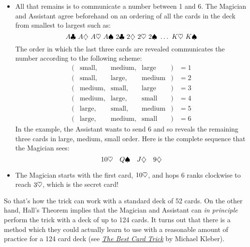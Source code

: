 \begin{itemize}
\begin{itemize}
\end{itemize}

\item All that remains is to communicate a number between 1 and 6.
The Magician and Assistant agree beforehand on an ordering of all the
cards in the deck from smallest to largest such as:
%
\[
A \clubsuit\  A \diamondsuit\  A \heartsuit\ A \spadesuit\
2 \clubsuit\  2 \diamondsuit\  2 \heartsuit\ 2 \spadesuit\
\dots\ K \heartsuit\ K \spadesuit
\]
%
The order in which the last three cards are revealed communicates the
number according to the following scheme:
%
\[
\begin{array}{rcccll}
(&\text{small},&\text{medium},&\text{large}&) & = 1 \\
(&\text{small},&\text{large},&\text{medium}&) & = 2 \\
(&\text{medium},&\text{small},&\text{large}&) & = 3 \\
(&\text{medium},&\text{large},&\text{small}&) & = 4 \\
(&\text{large},&\text{small},&\text{medium}&) & = 5 \\
(&\text{large},&\text{medium},&\text{small}&) & = 6
\end{array}
\]
%
In the example, the Assistant wants to send 6 and so reveals the
remaining three cards in large, medium, small order.  Here is the
complete sequence that the Magician sees:
%
\[
10 \heartsuit \quad Q \spadesuit \quad J \diamondsuit \quad 9 \diamondsuit
\]

\item The Magician starts with the first card, $10 \heartsuit$, and hops 6
ranks clockwise to reach $3 \heartsuit$, which is the secret card!

\end{itemize}

So that's how the trick can work with a standard deck of 52 cards.  On the
other hand, Hall's Theorem implies that the Magician and Assistant can
\emph{in principle} perform the trick with a deck of up to 124 cards.  It
turns out that there is a method which they could actually learn to use
with a reasonable amount of practice for a 124 card deck (see
\href{http://courses.csail.mit.edu/6.042/spring10/cardTrick.pdf}{\emph{The Best
    Card Trick}} by Michael Kleber).
\fi


\iffalse
http://people.brandeis.edu/~kleber/Papers/card.pdf

Also, \emph{Using a Card Trick to Teach Discrete Mathematics}, Simonson,
Shai, Holm, Tara S., Primus: Problems, Resources, and Issues in
Mathematics Undergraduate Studies, Sep 2003.
\fi

